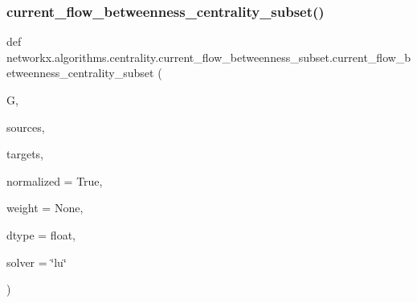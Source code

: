 \subsubsection{\texorpdfstring{current\+\_\+flow\+\_\+betweenness\+\_\+centrality\+\_\+subset()}{current\_flow\_betweenness\_centrality\_subset()}}
{\footnotesize\ttfamily def networkx.\+algorithms.\+centrality.\+current\+\_\+flow\+\_\+betweenness\+\_\+subset.\+current\+\_\+flow\+\_\+betweenness\+\_\+centrality\+\_\+subset (\begin{DoxyParamCaption}\item[{}]{G,  }\item[{}]{sources,  }\item[{}]{targets,  }\item[{}]{normalized = {\ttfamily True},  }\item[{}]{weight = {\ttfamily None},  }\item[{}]{dtype = {\ttfamily float},  }\item[{}]{solver = {\ttfamily \char`\"{}lu\char`\"{}} }\end{DoxyParamCaption})}

